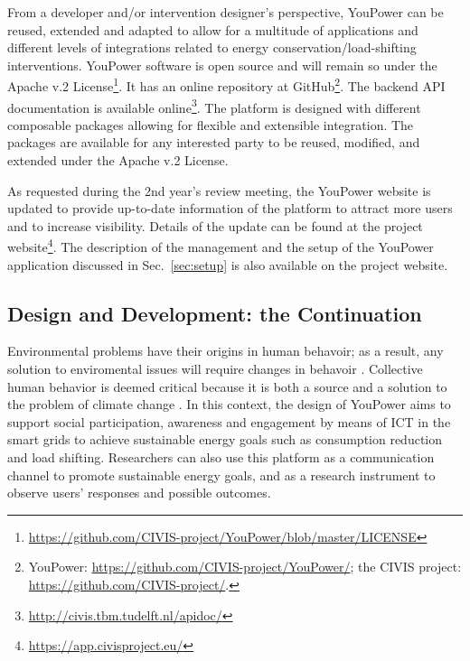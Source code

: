 From a developer and/or intervention designer's perspective, YouPower can be reused, extended and adapted to allow for a multitude of applications and different levels of integrations related to energy conservation/load-shifting interventions. 
YouPower software is open source and will remain so under the Apache v.2 License\footnote{\url{https://github.com/CIVIS-project/YouPower/blob/master/LICENSE}}. It has  an online repository at GitHub\footnote{YouPower: \url{https://github.com/CIVIS-project/YouPower/}; the CIVIS project: \url{https://github.com/CIVIS-project/}.}. 
The backend API documentation is available online\footnote{\url{http://civis.tbm.tudelft.nl/apidoc/}}. 
% 
The platform is designed with different composable packages allowing for flexible and extensible integration. The packages are available for any interested party to be reused, modified, and extended under the Apache v.2 License. 

As requested during the 2nd year's review meeting, the YouPower website is updated to provide  up-to-date information of the platform to attract more users and to increase visibility. Details of the update can be found at the project website\footnote{\url{https://app.civisproject.eu/}}. The description of the management and the setup of the YouPower application discussed in Sec.~\ref{sec:setup} is also available on the project website.




\subsection{Design and Development: the Continuation}

Environmental problems have their origins in human behavoir; as a result, any solution to enviromental issues will require changes in behavoir 
\citep{Schultz2014}.
Collective human behavior is deemed critical because it is both a source and a solution to the problem of climate change \citep{Masson2014}.
In this context, the design of YouPower aims to support social participation, awareness and engagement by means of ICT in the smart grids to achieve sustainable energy goals such as consumption reduction and load shifting. Researchers can also use this platform as a communication channel to promote sustainable energy goals, and as a research instrument to observe users' responses and possible outcomes. 

